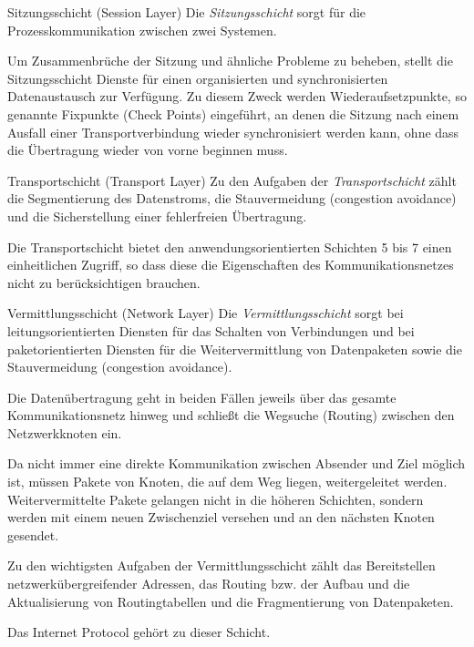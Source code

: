 \begin{defi}{Sitzungsschicht (Session Layer)}
    Die \emph{Sitzungsschicht} sorgt für die Prozesskommunikation zwischen zwei Systemen.

    Um Zusammenbrüche der Sitzung und ähnliche Probleme zu beheben, stellt die Sitzungsschicht Dienste für einen organisierten und synchronisierten Datenaustausch zur Verfügung.
    Zu diesem Zweck werden Wiederaufsetzpunkte, so genannte Fixpunkte (Check Points) eingeführt, an denen die Sitzung nach einem Ausfall einer Transportverbindung wieder synchronisiert werden kann, ohne dass die Übertragung wieder von vorne beginnen muss.
\end{defi}

\begin{defi}{Transportschicht (Transport Layer)}
    Zu den Aufgaben der \emph{Transportschicht} zählt die Segmentierung des Datenstroms, die Stauvermeidung (congestion avoidance) und die Sicherstellung einer fehlerfreien Übertragung.

    Die Transportschicht bietet den anwendungsorientierten Schichten 5 bis 7 einen einheitlichen Zugriff, so dass diese die Eigenschaften des Kommunikationsnetzes nicht zu berücksichtigen brauchen.
\end{defi}

\begin{defi}{Vermittlungsschicht (Network Layer)}
    Die \emph{Vermittlungsschicht} sorgt bei leitungsorientierten Diensten für das Schalten von Verbindungen und bei paketorientierten Diensten für die Weitervermittlung von Datenpaketen sowie die Stauvermeidung (congestion avoidance).

    Die Datenübertragung geht in beiden Fällen jeweils über das gesamte Kommunikationsnetz hinweg und schließt die Wegsuche (Routing) zwischen den Netzwerkknoten ein.

    Da nicht immer eine direkte Kommunikation zwischen Absender und Ziel möglich ist, müssen Pakete von Knoten, die auf dem Weg liegen, weitergeleitet werden.
    Weitervermittelte Pakete gelangen nicht in die höheren Schichten, sondern werden mit einem neuen Zwischenziel versehen und an den nächsten Knoten gesendet.

    Zu den wichtigsten Aufgaben der Vermittlungsschicht zählt das Bereitstellen netzwerkübergreifender Adressen, das Routing bzw. der Aufbau und die Aktualisierung von Routingtabellen und die Fragmentierung von Datenpaketen.

    Das Internet Protocol gehört zu dieser Schicht.
\end{defi}

